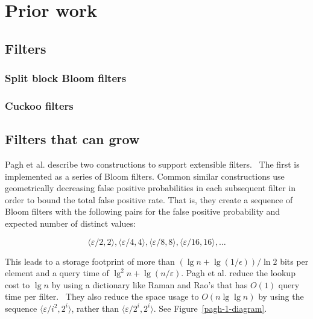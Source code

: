 \documentclass[sigconf, nonacm]{acmart}
\begin{document}

\section{Prior work}

\subsection{Filters} 

\subsubsection{Split block Bloom filters}

\cite{overtakes,ultra-fast,split-bloom,block-bloom}

\subsubsection{Cuckoo filters}

\cite{cuckoo}

\subsection{Filters that can grow}

Pagh et al. describe two constructions to support extensible filters.~\cite{psw}
The first is implemented as a series of Bloom filters.
Common similar constructions use geometrically decreasing false positive probabilities in each subsequent filter in order to bound the total false positive rate.
That is, they create a sequence of Bloom filters with the following pairs for the false positive probability and expected number of distinct values:

\[
\langle \varepsilon / 2, 2 \rangle,
 \langle \varepsilon / 4, 4 \rangle,
 \langle \varepsilon / 8, 8 \rangle,
 \langle \varepsilon / 16, 16 \rangle,
 \ldots
\]

This leads to a storage footprint of more than $(\lg n + \lg (1/\epsilon)) / \ln 2$ bits per element and a query time of $\lg^2 n + \lg (n/\varepsilon)$.
Pagh et al. reduce the lookup cost to $\lg n$ by using a dictionary like Raman and Rao's that has $O(1)$ query time per filter.~\cite{psw,succinct}
They also reduce the space usage to $O(n \lg \lg n)$ by using the sequence $\langle \varepsilon / i^2,  2^i \rangle$, rather than  $\langle \varepsilon / 2^i,  2^i \rangle$.
See Figure~\ref{pagh-1-diagram}.
\end{document}
